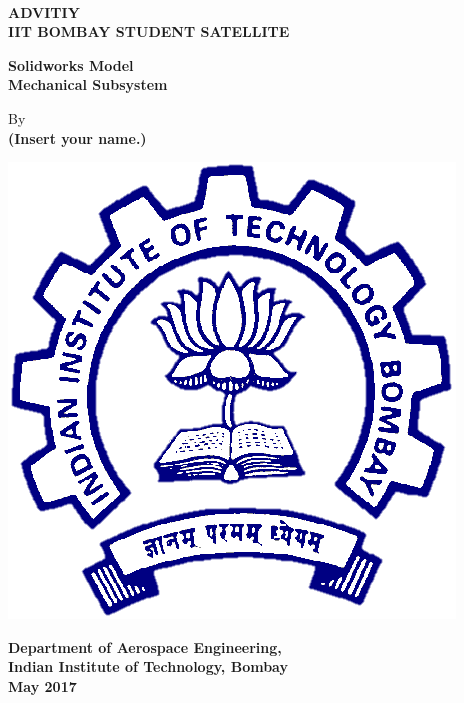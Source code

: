 \documentclass[12pt, a4paper, oneside]{book}
\begin{document}
%
%
\thispagestyle{empty}

{%
\sffamily
\centering
\Large

~\vspace{\fill}

{\huge 
\bfseries{ADVITIY\\ \bigskip IIT BOMBAY STUDENT SATELLITE}
}

\vspace{2cm}

{\LARGE
\bfseries{Solidworks Model\\ \bigskip Mechanical Subsystem}
}

\vspace{2cm}

By \\ \bigskip \bfseries{(Insert your name.)}

\vspace{1.5cm}

\includegraphics[scale=.4]{Figures/iitb_logo.png}


\vspace{2.5cm}
\bfseries{Department of Aerospace Engineering, \\ \bigskip Indian Institute of Technology, Bombay\\ \bigskip
May 2017}

}%
\end{document}
